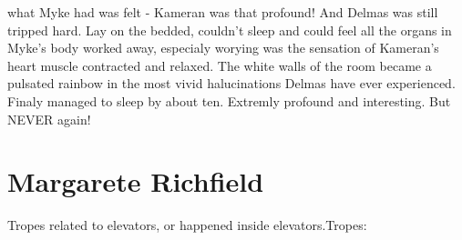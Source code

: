 \documentclass[12pt]{book}
\begin{document}
what Myke had was felt - Kameran was that profound! And Delmas was still tripped hard. Lay on the bedded, couldn't sleep and could feel all the organs in Myke's body worked away, especialy worying was the sensation of Kameran's heart muscle contracted and relaxed. The white walls of the room became a pulsated rainbow in the most vivid halucinations Delmas have ever experienced. Finaly managed to sleep by about ten. Extremly profound and interesting. But NEVER again!



\chapter{Margarete Richfield}

Tropes related to elevators, or happened inside elevators.Tropes:
\end{document}
